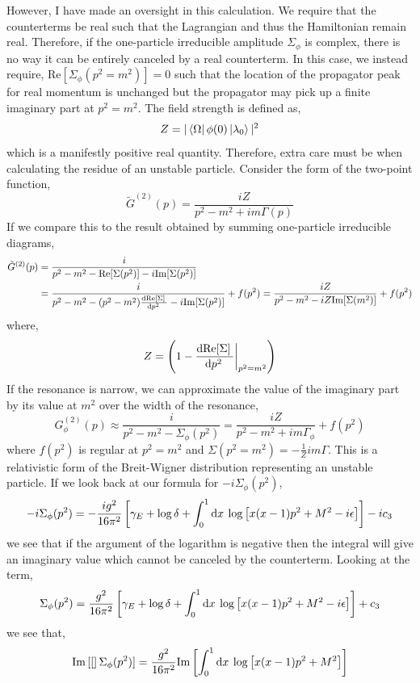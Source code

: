 \documentclass[12pt]{extarticle}
\begin{document}
However, I have made an oversight in this calculation. We require that the counterterms be real such that the Lagrangian and thus the Hamiltonian remain real. Therefore, if the one-particle irreducible amplitude $\Sigma_\phi$ is complex, there is no way it can be entirely canceled by a real counterterm. In this case, we instead require, $\mathrm{Re}[\Sigma_\phi(p^2 = m^2)] = 0$ such that the location of the propagator peak for real momentum is unchanged but the propagator may pick up a finite imaginary part at $p^2 = m^2$. The field strength is defined as, 
\[Z = |\left< \Omega \right|\phi(0)\left| \lambda_0 \right>|^2\]
which is a manifestly positive real quantity. Therefore, extra care must be when calculating the residue of an unstable particle. Consider the form of the two-point function,
\[ \tilde{G}^{(2)}(p) = \frac{i Z}{p^2 - m^2 + i m \Gamma(p)} \]
If we compare this to the result obtained by summing one-particle irreducible diagrams,
\begin{align*}
\tilde{G}^{(2)}(p) & = \frac{i}{p^2 - m^2 - \mathrm{Re}[\Sigma(p^2)] - i \mathrm{Im}[\Sigma(p^2)]}
\\
& = \frac{i}{p^2 - m^2 - (p^2 - m^2) \frac{\mathrm{d}\mathrm{Re}[\Sigma] \:}{\mathrm{d}p^2 \:}  - i \mathrm{Im}[\Sigma(p^2)]} + f(p^2) =\frac{i Z}{p^2 - m^2 - i Z \mathrm{Im}[\Sigma(m^2)]} + f(p^2) 
\end{align*}
where,
\[ Z = \left(1 - \frac{\mathrm{d}\mathrm{Re}[\Sigma] \:}{\mathrm{d}p^2 \:} \bigg|_{p^2 = m^2} \right) \]
If the resonance is narrow, we can approximate the value of the imaginary part by its value at $m^2$ over the width of the resonance,
\[ G^{(2)}_\phi(p) \approx \frac{i}{p^2 - m^2 - \Sigma_\phi(p^2)} = \frac{i Z}{p^2 - m^2 + i m \Gamma_\phi} + f(p^2)\]
where $f(p^2)$ is regular at $p^2 = m^2$ and $\Sigma(p^2 = m^2) = -\frac{1}{Z} i m \Gamma$. This is a relativistic form of the Breit-Wigner distribution representing an unstable particle. If we look back at our formula for $-i \Sigma_\phi(p^2)$,
\[ - i \Sigma_\phi(p^2) = - \frac{ig^2}{16 \pi^2}  \left[ \gamma_E + \log{\delta} + \int_{0}^{1} \mathrm{d}x \: \log{\left[ x(x-1)p^2 + M^2 - i \epsilon \right]} \right] - i c_3 \]
we see that if the argument of the logarithm is negative then the integral will give an imaginary value which cannot be canceled by the counterterm. Looking at the term,
\[ \Sigma_\phi(p^2) = \frac{g^2}{16 \pi^2}  \left[ \gamma_E + \log{\delta} + \int_{0}^{1} \mathrm{d}x \: \log{\left[ x(x-1)p^2 + M^2 - i \epsilon \right]} \right] + c_3 \]
we see that,
\[\mathrm{Im}\left[ [ \right]\Sigma_\phi(p^2)] = \frac{g^2}{16 \pi^2} \mathrm{Im}\left[ \int_{0}^{1} \mathrm{d}x \: \log{\left[ x(x-1)p^2 + M^2 \right]} \right] \] 
\end{document}
